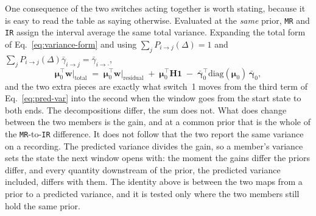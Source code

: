 \begin{appendixbox}
One consequence of the two switches acting together is worth stating, because it is easy to
read the table as saying otherwise. Evaluated at the \emph{same} prior, \texttt{MR} and
\texttt{IR} assign the interval average the same total variance. Expanding the total form of
Eq.~\ref{eq:variance-form} and using
$\sum_{j}P_{i\to j}(\Delta)=1$ and $\sum_{j}P_{i\to j}(\Delta)\bar{\gamma}_{i\to j}
=\bar{\gamma}_{i\to\cdot}$,
\begin{equation}
  \bm{\mu}_0^\top\mathbf{w}\big|_{\text{total}}
  \;=\;
  \bm{\mu}_0^\top\mathbf{w}\big|_{\text{residual}}
  \;+\; \bm{\mu}_0^\top\mathbf{H}\mathbf{1}
  \;-\; \bar{\bm{\gamma}}_0^\top\mathrm{diag}(\bm{\mu}_0)\,\bar{\bm{\gamma}}_0,
  \label{eq:mr-ir-identity}
\end{equation}
and the two extra pieces are exactly what switch~1 moves from the third term of
Eq.~\ref{eq:pred-var} into the second when the window goes from the start state to both
ends. The
decompositions differ, the sum does not. What does change between the two members is the
gain, and at a common prior that is the whole of the \texttt{MR}-to-\texttt{IR} difference.
It does not follow that the two report the same variance on a recording. The predicted
variance divides the gain, so a member's variance sets the state the next window opens with:
the moment the gains differ the priors differ, and every quantity downstream of the prior,
the predicted variance included, differs with them. The identity above is between the two
maps from a prior to a predicted variance, and it is tested only where the two members still
hold the same prior.


\end{appendixbox}
